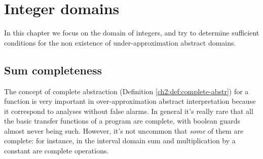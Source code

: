 \chapter{Integer domains}\label{ch4:integers}
In this chapter we focus on the domain of integers, and try to determine sufficient conditions for the non existence of under-approximation abstract domains.

\section{Sum completeness}
The concept of complete abstraction (Definition \ref{ch2:def:complete-abstr}) for a function is very important in over-approximation abstract interpretation because it correspond to analyses without false alarms. In general it's really rare that all the basic transfer functions of a program are complete, with boolean guards almost never being such. However, it's not uncommon that \textit{some} of them are complete: for instance, in the interval domain sum and multiplication by a constant are complete operations.

